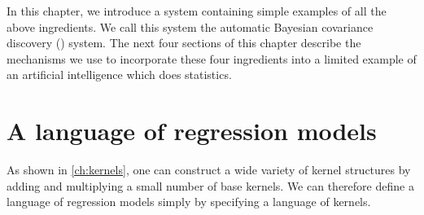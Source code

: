 In this chapter, we introduce a system containing simple examples of all the above ingredients.
We call this system the automatic Bayesian covariance discovery (\procedurename{}) system.
The next four sections of this chapter describe the mechanisms we use to incorporate these four ingredients into a limited example of an artificial intelligence which does statistics.



\section{A language of regression models}
\label{sec:improvements}

As shown in \cref{ch:kernels}, one can construct a wide variety of kernel structures by adding and multiplying a small number of base kernels.
We can therefore define a language of \gp{} regression models simply by specifying a language of kernels.

